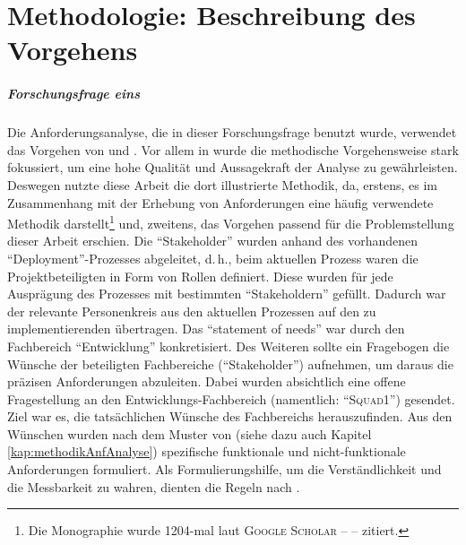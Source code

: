 \chapter{Methodologie: Beschreibung des Vorgehens}\label{kap:methodology}
\paragraph{Forschungsfrage eins}
Die Anforderungsanalyse, die in dieser Forschungsfrage benutzt wurde, verwendet das Vorgehen von \cite{hull_requirements_2011} und \cite{partsch_requirements-engineering_2010}. Vor allem in \cite{hull_requirements_2011} wurde die methodische Vorgehensweise stark fokussiert, um eine hohe Qualität und Aussagekraft der Analyse zu gewährleisten. Deswegen nutzte diese Arbeit die dort illustrierte Methodik, da, erstens, es im Zusammenhang mit der Erhebung von Anforderungen eine häufig verwendete Methodik darstellt\footnote{Die Monographie wurde 1204-mal laut \textsc{Google Scholar} -- \cite{google_llc_google_2020} -- zitiert.} und, zweitens, das Vorgehen passend für die Problemstellung dieser Arbeit erschien. Die \enquote{Stakeholder} wurden anhand des vorhandenen \enquote{Deployment}-Prozesses abgeleitet, d.\,h., beim aktuellen Prozess waren die Projektbeteiligten in Form von Rollen definiert. Diese wurden für jede Ausprägung des Prozesses mit bestimmten \enquote{Stakeholdern} gefüllt. Dadurch war der relevante Personenkreis aus den aktuellen Prozessen auf den zu implementierenden übertragen. Das \enquote{statement of needs} war durch den Fachbereich \enquote{Entwicklung} konkretisiert. Des Weiteren sollte ein Fragebogen die Wünsche der beteiligten Fachbereiche (\enquote{Stakeholder}) aufnehmen, um daraus die präzisen Anforderungen abzuleiten. Dabei wurden absichtlich eine offene Fragestellung an den Entwicklungs-Fachbereich (namentlich: \enquote{\textsc{Squad1}}) gesendet. Ziel war es, die tatsächlichen Wünsche des Fachbereichs herauszufinden. Aus den Wünschen wurden nach dem Muster von \cite[vgl.][S.\,28]{hull_requirements_2011} (siehe dazu auch Kapitel \vref{kap:methodikAnfAnalyse}) spezifische funktionale und nicht-funktionale Anforderungen formuliert. Als Formulierungshilfe, um die Verständlichkeit und die Messbarkeit zu wahren, dienten die Regeln nach \cite{rupp_formulierungsregel_2020}. 
\par
